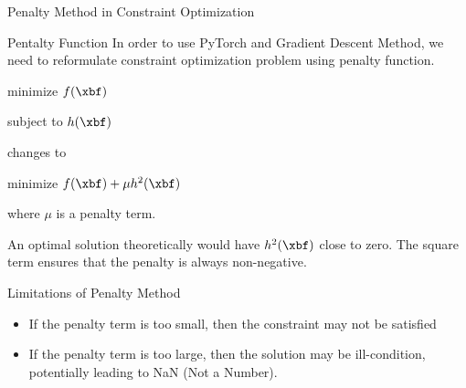 \documentclass[aspectratio=169,xcolor=dvipsnames,svgnames,x11names,fleqn]{beamer}
\begin{document}
\begin{frame}{}

\end{frame}


\begin{frame}{}

\end{frame}

\begin{sectionframe}{\faOpera}{Penalty Method in Constraint Optimization}
\end{sectionframe}

\begin{frame}{Pentalty Function}
  In order to use PyTorch and Gradient Descent Method, we need to reformulate constraint optimization problem using penalty function.

  \begin{tblock}{}
    minimize $f(\xbf)$

    subject to $h(\xbf)$
  \end{tblock}

  changes to 

  \begin{tblock}{}
    minimize $f(\xbf) + \mu h^2(\xbf)$

    where $\mu$ is a penalty term.
  \end{tblock}

  An optimal solution theoretically would have $h^2(\xbf)$ close to zero. The square term ensures that the penalty is always non-negative.
  
\end{frame}

\begin{frame}{Limitations of Penalty Method}
  \begin{itemize}
    \item If the penalty term is too small, then the constraint may not be satisfied
    \item If the penalty term is too large, then the solution may be ill-condition, potentially leading to NaN (Not a Number).
  \end{itemize}
\end{frame}
\end{document}
